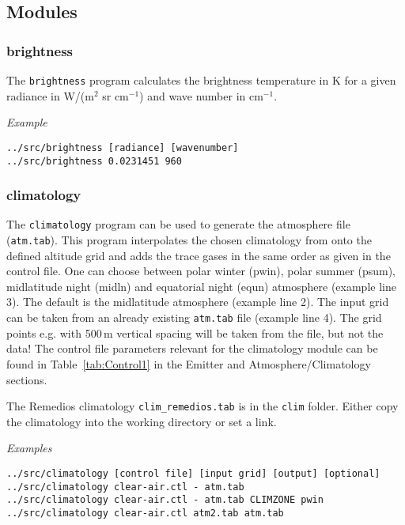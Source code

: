 \subsection{Modules}

\subsubsection{brightness}
The \texttt{brightness} program calculates the brightness temperature in K for a given radiance in W/(m$^2$ sr cm$^{-1}$) and wave number in cm$^{-1}$.

\emph{Example}\linebreak
\begin{verbatim}
../src/brightness [radiance] [wavenumber]
../src/brightness 0.0231451 960
\end{verbatim}

\subsubsection{climatology}
\label{sec:ModuleClimatology}
The \texttt{climatology} program can be used to generate the atmosphere file (\texttt{atm.tab}). This program interpolates the chosen climatology from \citet{Remedios2007} onto the defined altitude grid and adds the trace gases in the same order as given in the control file. One can choose between polar winter (pwin), polar summer (psum), midlatitude night (midln) and equatorial night (equn) atmosphere (example line 3). The default is the midlatitude atmosphere (example line 2). The input grid can be taken from an already existing \texttt{atm.tab} file (example line 4). The grid points e.g. with 500\,m vertical spacing will be taken from the file, but not the data! The control file parameters relevant for the climatology module can be found in Table~\ref{tab:Control1} in the Emitter and Atmosphere/Climatology sections.

The Remedios climatology \texttt{clim\_remedios.tab} is in the \texttt{clim} folder. Either copy the climatology into the working directory or set a link.

\emph{Examples}\linebreak
\begin{verbatim}
../src/climatology [control file] [input grid] [output] [optional]
../src/climatology clear-air.ctl - atm.tab
../src/climatology clear-air.ctl - atm.tab CLIMZONE pwin
../src/climatology clear-air.ctl atm2.tab atm.tab
\end{verbatim}

